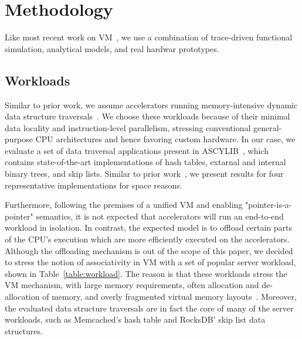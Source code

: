 \section{Methodology}
\label{sec:methodology}

Like most recent work on VM~\cite{basu:efficient, pham:increasing, pham:colt, bhattacharjee:large-reach, barr:spectlb, papadopoulou:prediction-based, saulsbury:recently-based}, we use a combination of trace-driven functional simulation, analytical models, and real hardwar prototypes.

\subsection{Workloads}

Similar to prior work, we assume accelerators running memory-intensive dynamic data structure traversals~\cite{picorel:near-memory, haria:devirtualizing, kocberber:meet, hsieh:accelerating}. We choose these workloads because of their minimal data locality and instruction-level parallelism, stressing conventional general-purpose CPU architectures and hence favoring custom hardware. In our case, we evaluate a set of data traversal applications present in ASCYLIB~\cite{david:asynchronized}, which contains state-of-the-art implementations of hash tables, extarnal and internal binary trees, and skip lists. Similar to prior work~\cite{picorel:near-memory}, we present results for four representative implementations for space reasons.


Furthermore, following the premises of a unified VM and enabling "pointer-is-a-pointer" semantics, it is not expected that accelerators will run an end-to-end workload in isolation. In contrast, the expected model is to offload certain parts of the CPU's execution which are more efficiently executed on the accelerators. Although the offloading mechanism is out of the scope of this paper, we decided to stress the notion of associativity in VM with a set of popular server workload, shown in Table~\ref{table:workload}. The reason is that these workloads stress the VM mechanism, with large memory requirements, often allocation and de-allocation of memory, and overly fragmented virtual memory layouts~\cite{picorel:near-memory}. Moreover, the evaluated data structure traversals are in fact the core of many of the server workloads, such as Memcached's hash table and RocksDB' skip list data structures.

